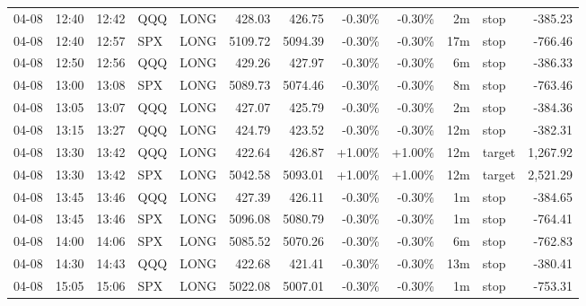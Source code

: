 \documentclass[11pt,a4paper]{article}
\begin{document}
\begin{center}
\begin{longtable}{>{\color{txtmain}}l l l l l r r r r r >{\color{txtmain}}l r}
04-08 & 12:40 & 12:42 & QQQ & LONG & 428.03 & 426.75 & \textcolor{lossred}{-0.30\%} & \textcolor{lossred}{-0.30\%} & 2m & stop & \textcolor{lossred}{-385.23} \\
04-08 & 12:40 & 12:57 & SPX & LONG & 5109.72 & 5094.39 & \textcolor{lossred}{-0.30\%} & \textcolor{lossred}{-0.30\%} & 17m & stop & \textcolor{lossred}{-766.46} \\
04-08 & 12:50 & 12:56 & QQQ & LONG & 429.26 & 427.97 & \textcolor{lossred}{-0.30\%} & \textcolor{lossred}{-0.30\%} & 6m & stop & \textcolor{lossred}{-386.33} \\
04-08 & 13:00 & 13:08 & SPX & LONG & 5089.73 & 5074.46 & \textcolor{lossred}{-0.30\%} & \textcolor{lossred}{-0.30\%} & 8m & stop & \textcolor{lossred}{-763.46} \\
04-08 & 13:05 & 13:07 & QQQ & LONG & 427.07 & 425.79 & \textcolor{lossred}{-0.30\%} & \textcolor{lossred}{-0.30\%} & 2m & stop & \textcolor{lossred}{-384.36} \\
04-08 & 13:15 & 13:27 & QQQ & LONG & 424.79 & 423.52 & \textcolor{lossred}{-0.30\%} & \textcolor{lossred}{-0.30\%} & 12m & stop & \textcolor{lossred}{-382.31} \\
04-08 & 13:30 & 13:42 & QQQ & LONG & 422.64 & 426.87 & \textcolor{wingreen}{+1.00\%} & \textcolor{wingreen}{+1.00\%} & 12m & target & \textcolor{wingreen}{1,267.92} \\
04-08 & 13:30 & 13:42 & SPX & LONG & 5042.58 & 5093.01 & \textcolor{wingreen}{+1.00\%} & \textcolor{wingreen}{+1.00\%} & 12m & target & \textcolor{wingreen}{2,521.29} \\
04-08 & 13:45 & 13:46 & QQQ & LONG & 427.39 & 426.11 & \textcolor{lossred}{-0.30\%} & \textcolor{lossred}{-0.30\%} & 1m & stop & \textcolor{lossred}{-384.65} \\
04-08 & 13:45 & 13:46 & SPX & LONG & 5096.08 & 5080.79 & \textcolor{lossred}{-0.30\%} & \textcolor{lossred}{-0.30\%} & 1m & stop & \textcolor{lossred}{-764.41} \\
04-08 & 14:00 & 14:06 & SPX & LONG & 5085.52 & 5070.26 & \textcolor{lossred}{-0.30\%} & \textcolor{lossred}{-0.30\%} & 6m & stop & \textcolor{lossred}{-762.83} \\
04-08 & 14:30 & 14:43 & QQQ & LONG & 422.68 & 421.41 & \textcolor{lossred}{-0.30\%} & \textcolor{lossred}{-0.30\%} & 13m & stop & \textcolor{lossred}{-380.41} \\
04-08 & 15:05 & 15:06 & SPX & LONG & 5022.08 & 5007.01 & \textcolor{lossred}{-0.30\%} & \textcolor{lossred}{-0.30\%} & 1m & stop & \textcolor{lossred}{-753.31} \\

\end{longtable}
\end{center}
\end{document}
